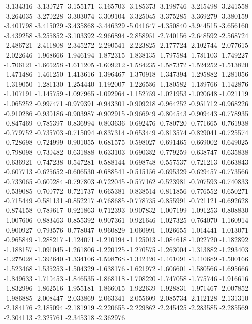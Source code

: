 -3.134316
-3.130727
-3.155171
-3.165703
-3.185373
-3.198746
-3.215498
-3.241558
-3.264035
-3.270228
-3.303074
-3.309104
-3.325045
-3.375285
-3.369279
-3.380159
-3.401798
-3.415029
-3.435868
-3.446329
-5.041647
-4.350840
-3.944515
-3.656160
-3.439258
-3.256852
-3.103392
-2.966894
-2.858951
-2.740156
-2.648592
-2.568724
-2.486721
-2.411808
-2.345272
-2.290541
-2.223825
-2.177724
-2.102744
-2.077615
-2.022646
-1.968666
-1.946194
-1.872315
-1.838135
-1.797584
-1.781103
-1.749227
-1.706121
-1.666258
-1.611205
-1.609212
-1.584235
-1.587372
-1.524252
-1.513820
-1.471486
-1.461250
-1.413616
-1.396467
-1.370918
-1.347394
-1.295882
-1.281056
-1.319050
-1.281130
-1.254440
-1.192007
-1.226586
-1.180582
-1.189766
-1.142876
-1.107191
-1.145759
-1.097965
-1.092964
-1.152759
-1.021953
-1.020648
-1.021119
-1.065252
-0.997471
-0.979391
-0.943301
-0.909218
-0.964252
-0.951712
-0.968226
-0.910286
-0.930186
-0.903987
-0.902915
-0.966949
-0.804543
-0.909443
-0.778935
-0.847469
-0.785397
-0.836994
-0.803636
-0.692476
-0.780720
-0.771665
-0.761938
-0.779752
-0.735703
-0.715094
-0.837314
-0.653449
-0.813574
-0.829041
-0.725574
-0.728698
-0.724999
-0.901055
-0.681575
-0.598027
-0.691465
-0.669002
-0.649025
-0.798098
-0.730482
-0.631888
-0.633103
-0.690382
-0.779259
-0.638747
-0.635838
-0.636921
-0.747238
-0.547281
-0.588144
-0.698748
-0.557537
-0.721213
-0.663843
-0.607713
-0.626652
-0.606530
-0.688541
-0.515156
-0.695329
-0.629457
-0.773566
-0.733065
-0.600284
-0.797803
-0.722045
-0.577162
-0.523981
-0.707593
-0.740833
-0.539085
-0.700772
-0.721737
-0.665381
-0.838514
-0.811856
-0.776552
-0.650271
-0.715449
-0.581131
-0.852217
-0.768685
-0.778735
-0.855991
-0.721121
-0.692628
-0.874158
-0.789617
-0.921863
-0.712393
-0.907832
-1.007199
-1.091253
-0.808830
-1.007606
-0.883463
-0.855392
-0.907361
-0.921646
-1.027325
-0.764070
-1.160914
-0.900927
-0.793576
-0.778047
-0.960829
-1.060991
-1.026655
-1.014441
-1.013071
-0.965849
-1.288217
-1.124071
-1.210194
-1.125013
-1.084618
-1.022720
-1.182892
-1.188157
-1.091045
-1.261806
-1.220125
-1.270575
-1.263004
-1.313882
-1.293403
-1.275028
-1.392640
-1.334106
-1.598768
-1.342420
-1.461091
-1.410689
-1.500166
-1.523468
-1.536253
-1.504329
-1.638176
-1.621972
-1.606601
-1.580566
-1.695666
-1.849633
-1.710453
-1.846535
-1.868118
-1.708220
-1.747058
-1.775746
-1.916616
-1.832996
-1.862516
-1.955181
-1.866015
-1.922639
-1.928831
-1.971467
-2.007852
-1.986885
-2.008447
-2.033869
-2.063341
-2.055609
-2.085734
-2.112128
-2.131310
-2.184176
-2.185094
-2.181919
-2.220655
-2.229862
-2.245425
-2.283585
-2.285569
-2.304113
-2.325761
-2.345318
-2.362976
